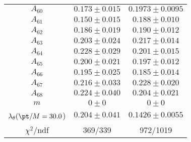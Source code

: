 \begin{tabular}{c|c|c}
$A_60$ & $0.173\pm0.015$ & $0.1973\pm0.0095$ \\
$A_61$ & $0.150\pm0.015$ & $0.188\pm0.010$ \\
$A_62$ & $0.186\pm0.019$ & $0.190\pm0.012$ \\
$A_63$ & $0.203\pm0.024$ & $0.217\pm0.014$ \\
$A_64$ & $0.228\pm0.029$ & $0.201\pm0.015$ \\
$A_65$ & $0.200\pm0.021$ & $0.197\pm0.012$ \\
$A_66$ & $0.195\pm0.025$ & $0.185\pm0.014$ \\
$A_67$ & $0.216\pm0.033$ & $0.228\pm0.020$ \\
$A_68$ & $0.224\pm0.040$ & $0.204\pm0.021$ \\
$m$ & $0\pm0$ & $0\pm0$ \\
$\lambda_\theta(\pt/M = 30.0$) & $0.204\pm0.041$ & $0.1426\pm0.0055$ \\
\hline
$\chi^2$/ndf & 369/339 & 972/1019
\end{tabular}
